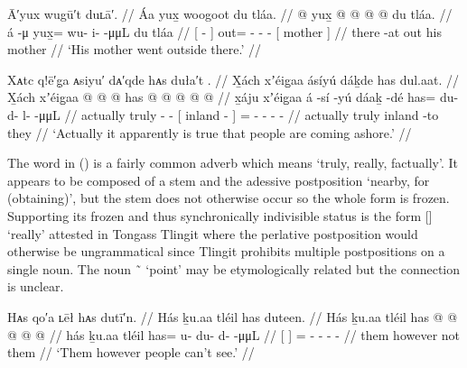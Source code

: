 \ex\label{ex:89-77-mother-went-outside}%
%
\begingl
	\glpreamble	Ā′yux wugū′t duʟā′. //
	\glpreamble	Áa yux̱ woogoot du tláa. //
	\gla	{}  @ {} {}
		yux̱ @  @ {} @ {} @ {}
		{} du tláa. {} //
	\glb	{} á -μ {}
		yux̱= wu- i-  -μμL
		{} du tláa {} //
	\glc	{}[  - {}]
		out= - -  -
		{}[  mother {}] //
	\gld	{} there -at {}
		out  {} {} {}
		{} his mother {} //
	\glft	‘His mother went outside there.’
		//
\endgl
\xe

\ex\label{ex:89-78-true-people-ashore}%
%
\begingl
	\glpreamble	Xᴀtc q!ē′g̣a ᴀsiyu′ dᴀ′qde hᴀs duła′t . //
	\glpreamble	X̱ách xʼéig̱aa ásíyú dáḵde has dul.aat. //
	\gla	X̱ách xʼéig̱aa  @ {} @ {}
		{}  @ {} {} has @  @ {} @ {} @ {} @ {} //
	\glb	x̱áju xʼéig̱aa á -sí -yú
		{} dáaḵ -dé {}
		has= du- d- l-  -μμL //
	\glc	actually truly  - -
		{}[ inland - {}]
		= - - -  - //
	\gld	actually truly  {} {}
		{} inland -to {}
		they  {} {} {} {} //
	\glft	‘Actually it apparently is true that people are coming ashore.’
		//
\endgl
\xe

The word  in (\lastx) is a fairly common adverb which means ‘truly, really, factually’.
It appears to be composed of a stem  and the adessive postposition  ‘nearby, for (obtaining)’, but the stem does not otherwise occur so the whole form is frozen.
Supporting its frozen and thus synchronically indivisible status is the form  [] ‘really’ attested in Tongass Tlingit \parencite[f04/34]{leer:1973} where the perlative postposition  would otherwise be ungrammatical since Tlingit prohibits multiple postpositions on a single noun.
The noun  \~\  ‘point’ may be etymologically related but the connection is unclear.

\ex\label{ex:89-79-people-cant-see}%
%
\begingl
	\glpreamble	Hᴀs qo′a ʟēł hᴀs dutī′n. //
	\glpreamble	Hás ḵu.aa tléil has duteen. //
	\gla	{} Hás {} ḵu.aa tléil has @  @ {} @ {} @ {} @ {} //
	\glb	{} hás {} ḵu.aa tléil has= u- du- d-  -μμL //
	\glc	{}[  {}]   = - - -  - //
	\gld	{} them {} however not them  {} {} {} {} //
	\glft	‘Them however people can’t see.’
		//
\endgl
\xe

